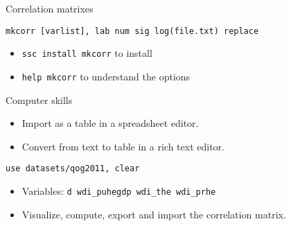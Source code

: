 \documentclass[t]{beamer}
\begin{document}
    \begin{frame}[c]{Correlation matrixes}
	
		\begin{block}{\texttt{mkcorr [varlist], lab num sig log(file.txt) replace}}
			\begin{itemize}
				\item \texttt{ssc install mkcorr} to install
				\item \texttt{help mkcorr} to understand the options
			\end{itemize}
		\end{block}
	
		\begin{alertblock}{Computer skills}
			\begin{itemize}
				\item Import as a table in a spreadsheet editor.
				\item Convert from text to table in a rich text editor.
			\end{itemize}
			  
		\end{alertblock}

        \begin{exampleblock}{\texttt{use datasets/qog2011, clear}}
			
			\begin{itemize}
				\item Variables: \texttt{d wdi\_puhegdp wdi\_the wdi\_prhe}
				\item Visualize, compute, export and import the correlation matrix.
			\end{itemize}
			
        \end{exampleblock}

	\end{frame}
		
\end{document}
